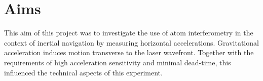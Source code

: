 
\section{Aims}
This aim of this project was to investigate the use of atom
interferometry in the context of inertial navigation by measuring
horizontal accelerations. Gravitational acceleration induces motion
transverse to the laser wavefront. Together with the requirements of
high acceleration sensitivity and minimal dead-time, this influenced the technical
aspects of this experiment.  
